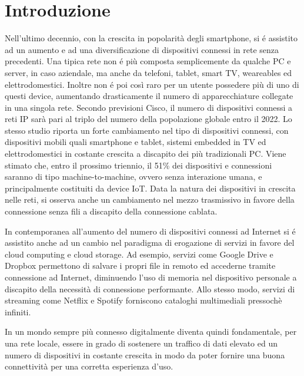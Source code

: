 \raggedbottom
\chapter{Introduzione}
Nell'ultimo decennio, con la crescita in popolarit\`a degli smartphone, si \'e assistito ad un aumento e ad una diversificazione di dispositivi connessi in rete senza precedenti.
Una tipica rete non \'e pi\`u composta semplicemente da qualche PC e server, in caso aziendale, ma anche da telefoni, tablet, smart TV, weareables ed elettrodomestici.
Inoltre non \'e poi cos\`i raro per un utente possedere pi\`u di uno di questi device, aumentando drasticamente il numero di apparecchiature collegate in una singola rete.
Secondo previsioni Cisco, il numero di dispositivi connessi a reti IP sar\`a pari al triplo del numero della popolazione globale entro il 2022\cite{CVI}.
Lo stesso studio riporta un forte cambiamento nel tipo di dispositivi connessi, con dispositivi mobili quali smartphone e tablet, sistemi embedded in TV ed elettrodomestici in costante crescita a discapito dei pi\`u tradizionali PC.
Viene stimato che, entro il prossimo triennio, il 51\% dei dispositivi e connessioni saranno di tipo machine-to-machine, ovvero senza interazione umana, e principalmente costituiti da device IoT.
Data la natura dei dispositivi in crescita nelle reti, si osserva anche un cambiamento nel mezzo trasmissivo in favore della connessione senza fili a discapito della connessione cablata.

In contemporanea all'aumento del numero di dispositivi connessi ad Internet si \'e assistito anche ad un cambio nel paradigma di erogazione di servizi in favore del cloud computing e cloud storage.
Ad esempio, servizi come Google Drive e Dropbox permettono di salvare i propri file in remoto ed accederne tramite connessione ad Internet, diminuendo l'uso di memoria nel dispositivo personale a discapito della necessit\`a di connessione performante.
Allo stesso modo, servizi di streaming come Netflix e Spotify forniscono cataloghi multimediali pressoch\`e infiniti.

In un mondo sempre pi\`u connesso digitalmente diventa quindi fondamentale, per una rete locale, essere in grado di sostenere un traffico di dati elevato ed un numero di dispositivi in costante crescita in modo da poter fornire una buona connettivit\`a per una corretta esperienza d'uso.

